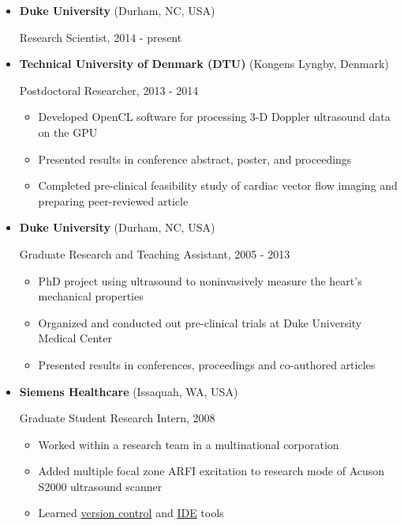 \documentclass[]{article}
\begin{document}
\begin{itemize}
\item
  \textbf{Duke University} (Durham, NC, USA)

  Research Scientist, 2014 - present
\item
  \textbf{Technical University of Denmark (DTU)} (Kongens Lyngby,
  Denmark)

  Postdoctoral Researcher, 2013 - 2014

  \begin{itemize}
  \itemsep1pt\parskip0pt
  \item
    Developed OpenCL software for processing 3-D Doppler ultrasound data
    on the GPU
  \item
    Presented results in conference abstract, poster, and proceedings
  \item
    Completed pre-clinical feasibility study of cardiac vector flow
    imaging and preparing peer-reviewed article
  \end{itemize}
\item
  \textbf{Duke University} (Durham, NC, USA)

  Graduate Research and Teaching Assistant, 2005 - 2013

  \begin{itemize}
  \itemsep1pt\parskip0pt
  \item
    PhD project using ultrasound to noninvasively measure the heart's
    mechanical properties
  \item
    Organized and conducted out pre-clinical trials at Duke University
    Medical Center
  \item
    Presented results in conferences, proceedings and co-authored
    articles
  \end{itemize}
\item
  \textbf{Siemens Healthcare} (Issaquah, WA, USA)

  Graduate Student Research Intern, 2008

  \begin{itemize}
  \itemsep1pt\parskip0pt
  \item
    Worked within a research team in a multinational corporation
  \item
    Added multiple focal zone ARFI excitation to research mode of Acuson
    S2000 ultrasound scanner
  \item
    Learned
    \href{http://www-03.ibm.com/software/products/en/clearcase}{version
    control} and \href{http://www.visualstudio.com/}{IDE} tools
  \end{itemize}
\end{itemize}
\end{document}
